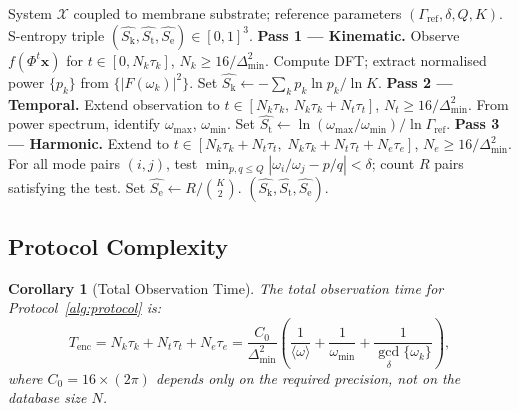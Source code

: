 \documentclass[11pt,twocolumn,a4paper]{article}
\newtheorem{corollary}[theorem]{Corollary}
\theoremstyle{definition}
\theoremstyle{remark}
\newcommand{\Sk}{S_{\mathrm{k}}}
\newcommand{\St}{S_{\mathrm{t}}}
\newcommand{\Se}{S_{\mathrm{e}}}
\begin{document}
\begin{algorithm}[t]
\caption{Forced Three-Pass S-Entropy Measurement Protocol}
\label{alg:protocol}
\begin{algorithmic}[1]
\Require System $\mathcal{X}$ coupled to membrane substrate;
  reference parameters $(\Gamma_{\mathrm{ref}}, \delta, Q, K)$.
\Ensure S-entropy triple $(\hat{\Sk}, \hat{\St}, \hat{\Se}) \in [0,1]^3$.
\vspace{4pt}
\State \textbf{Pass 1 --- Kinematic.}
  Observe $f(\Phi^t \mathbf{x})$ for $t \in [0, N_k \tau_k]$,
  $N_k \geq 16/\Delta_{\min}^2$.
  Compute DFT; extract normalised power $\{p_k\}$ from
  $\{|F(\omega_k)|^2\}$. Set
  $\hat{\Sk} \leftarrow -\sum_k p_k \ln p_k / \ln K$.
\vspace{4pt}
\State \textbf{Pass 2 --- Temporal.}
  Extend observation to $t \in [N_k\tau_k,\, N_k\tau_k + N_t\tau_t]$,
  $N_t \geq 16/\Delta_{\min}^2$.
  From power spectrum, identify $\omega_{\max}$, $\omega_{\min}$.
  Set $\hat{\St} \leftarrow \ln(\omega_{\max}/\omega_{\min}) /
  \ln\Gamma_{\mathrm{ref}}$.
\vspace{4pt}
\State \textbf{Pass 3 --- Harmonic.}
  Extend to $t \in [N_k\tau_k + N_t\tau_t,\;
  N_k\tau_k + N_t\tau_t + N_e\tau_e]$,
  $N_e \geq 16/\Delta_{\min}^2$.
  For all mode pairs $(i,j)$, test
  $\min_{p,q \leq Q} |\omega_i/\omega_j - p/q| < \delta$;
  count $R$ pairs satisfying the test.
  Set $\hat{\Se} \leftarrow R / \binom{K}{2}$.
\vspace{4pt}
\State \Return $(\hat{\Sk}, \hat{\St}, \hat{\Se})$.
\end{algorithmic}
\end{algorithm}

\subsection{Protocol Complexity}

\begin{corollary}[Total Observation Time]
\label{cor:complexity}
The total observation time for Protocol~\ref{alg:protocol} is:
\begin{equation}
T_{\mathrm{enc}} = N_k\tau_k + N_t\tau_t + N_e\tau_e
= \frac{C_0}{\Delta_{\min}^2}\left(\frac{1}{\langle\omega\rangle}
+ \frac{1}{\omega_{\min}} + \frac{1}{\gcd_\delta\{\omega_k\}}\right),
\label{eq:tenc}
\end{equation}
where $C_0 = 16 \times (2\pi)$ depends only on the required precision, not
on the database size $N$.
\end{corollary}
\end{document}
